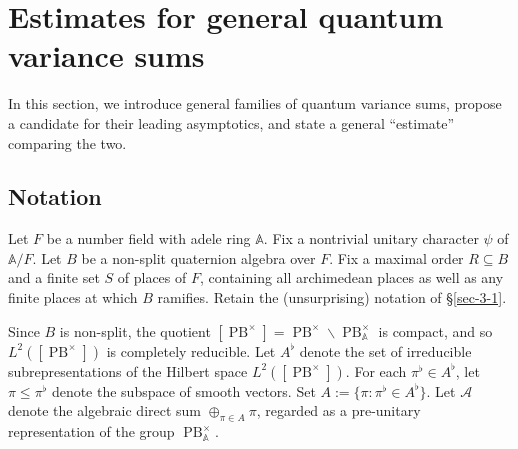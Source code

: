 \documentclass[reqno,10pt]{amsart}
\theoremstyle{plain} %
\theoremstyle{definition}
\theoremstyle{plain} %
\theoremstyle{remark}
\theoremstyle{itplain} %
\theoremstyle{remark} %
\renewcommand{\leq}{\leqslant}
\numberwithin{equation}{section}
\def\PB{\operatorname{PB}}
\begin{document}
\section{Estimates for general quantum variance sums\label{sec:estimates-general-var}}
\label{sec-4}
In this section, we introduce general families of quantum variance sums, propose a candidate for their leading asymptotics, and state a general ``estimate'' comparing the two.
\subsection{Notation}
\label{sec-4-1}
Let $F$ be a number field with adele ring $\mathbb{A}$.  Fix a nontrivial unitary character $\psi$ of $\mathbb{A}/F$.  Let $B$ be a non-split quaternion algebra over $F$.  Fix a maximal order $R \subseteq B$ and a finite set $S$ of places of $F$, containing all archimedean places as well as any finite places at which $B$ ramifies.  Retain the (unsurprising) notation of \S\ref{sec-3-1}.

Since $B$ is non-split, the quotient $[\PB^\times]= \PB^\times \backslash \PB^\times_\mathbb{A}$ is compact, and so $L^2([\PB^\times])$ is completely reducible.  Let $A^{\flat}$ denote the set of irreducible subrepresentations of the Hilbert space $L^2([\PB^\times])$.  For each $\pi^{\flat} \in A^{\flat}$, let $\pi \leq \pi^{\flat}$ denote the subspace of smooth vectors.  Set $A := \{\pi : \pi^\flat \in A^{\flat}\}$.  Let $\mathcal{A}$ denote the algebraic direct sum $\oplus_{\pi \in A} \pi$, regarded as a pre-unitary representation of the group $\PB^\times_\mathbb{A}$.
\end{document}
